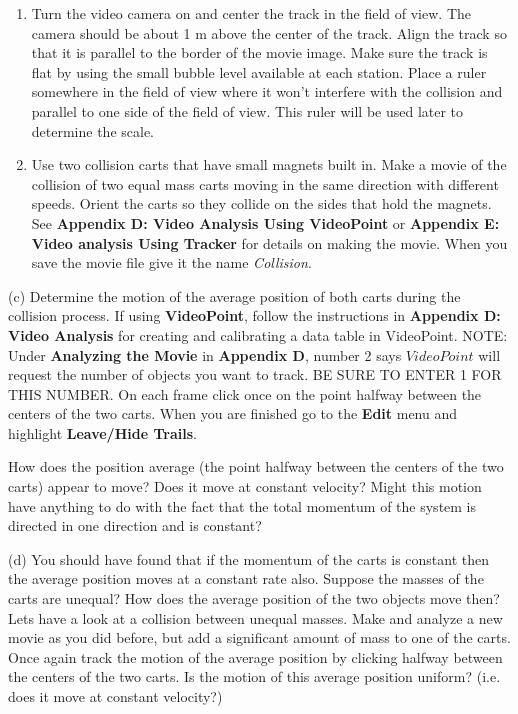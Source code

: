 \begin{enumerate}
\item Turn the video camera on and center the track in the field of view. The camera
should be about 1 m above the center of the track. Align the track so that it
is parallel to the border of the movie image. Make sure the track is flat by
using the small bubble level available at each station. Place a ruler somewhere in
the field of view where it won't interfere with the collision and parallel to
one side of the field of view. This ruler will be used later to determine the
scale. 
\item Use two collision carts that have small magnets built in. Make a movie of the
collision of two equal mass carts moving in the same direction with different
speeds. Orient the carts so they collide on the sides that hold the magnets.
See \textbf{Appendix D: Video Analysis Using VideoPoint} or \textbf{Appendix E: Video analysis Using Tracker} for details on making the movie. When
you save the movie file give it the name \textit{Collision}. 
\end{enumerate}
(c) Determine the motion of the average position of both carts during the collision process. If using \textbf{VideoPoint},  follow the instructions in \textbf{Appendix D: Video Analysis} for creating
and calibrating a data table in VideoPoint. NOTE: Under \textbf{Analyzing the Movie} in \textbf{Appendix D}, number 2 says $VideoPoint$ will request the number of objects you want to track.  BE SURE TO ENTER 1 FOR THIS NUMBER. On each frame click once on the point halfway between the centers of the two carts. When you are finished go to the \textbf{Edit} menu and highlight \textbf{Leave/Hide Trails}.

\newpage

How does the position average (the point halfway between the centers of the two carts) appear to move? Does it move at constant velocity? Might this motion have anything to do with the fact that the total momentum of the system is directed in one direction and is constant?
\vspace{40mm}

(d) You should have found that if the momentum of the carts is constant then
the average position moves at a constant rate also. Suppose the masses of the
carts are unequal? How does the average position of the two objects move then?
Lets have a look at a collision between unequal masses. Make and analyze a new
movie as you did before, but add a significant amount of mass to one of the
carts. Once again track the motion of the average position by clicking halfway
between the centers of the two carts. Is the motion of this average position
uniform? (i.e. does it move at constant velocity?)
\vspace{40mm}

